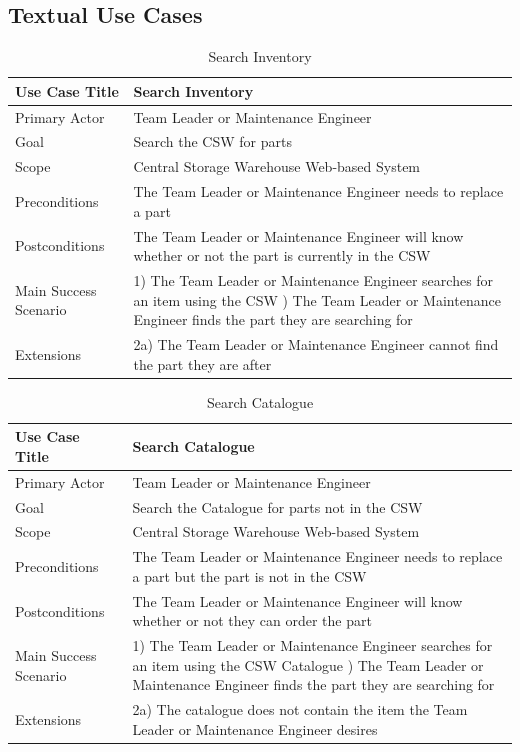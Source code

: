 \subsection{Textual Use Cases}
\begin{table}[h]
	\centering
	\caption{Search Inventory}
	\label{Search-Inventory}
	\begin{tabularx}{\textwidth}{| l | X |}
		\hline
		Use Case Title	&  Search Inventory\\ \hline \hline
		Primary Actor	&  Team Leader or Maintenance Engineer \\ \hline
		Goal	&  Search the CSW for parts\\ \hline
		Scope	&  Central Storage Warehouse Web-based System\\ \hline
		Preconditions	&  The Team Leader or Maintenance Engineer needs to replace a part\\ \hline
		Postconditions	&  The Team Leader or Maintenance Engineer will know whether or not the part is currently in the CSW\\ \hline
		Main Success Scenario	&  
		1) The Team Leader or Maintenance Engineer searches for an item using the CSW \newline
		2) The Team Leader or Maintenance Engineer finds the part they are searching for
		\\ \hline
		Extensions	&  2a) The Team Leader or Maintenance Engineer cannot find the part they are after \\ \hline
	\end{tabularx}
\end{table}

\begin{table}[h]
	\centering
	\caption{Search Catalogue}
	\label{Search-Catalogue}
	\begin{tabularx}{\textwidth}{| l | X |}
		\hline
		Use Case Title	&  Search Catalogue\\ \hline \hline
		Primary Actor	&  Team Leader or Maintenance Engineer \\ \hline
		Goal	&  Search the Catalogue for parts not in the CSW\\ \hline
		Scope	&  Central Storage Warehouse Web-based System\\ \hline
		Preconditions	&  The Team Leader or Maintenance Engineer needs to replace a part but the part is not in the CSW\\ \hline
		Postconditions	&  The Team Leader or Maintenance Engineer will know whether or not they can order the part\\ \hline
		Main Success Scenario	&  
		1) The Team Leader or Maintenance Engineer searches for an item using the CSW Catalogue \newline
		2) The Team Leader or Maintenance Engineer finds the part they are searching for
		\\ \hline
		Extensions	&  2a) The catalogue does not contain the item the Team Leader or Maintenance Engineer desires \\ \hline
	\end{tabularx}
\end{table}


